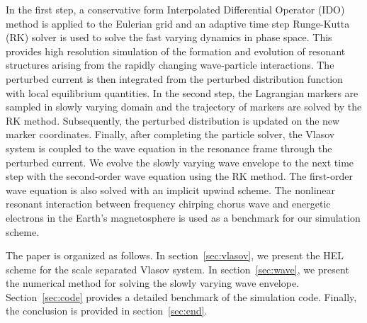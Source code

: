 In the first step,  a conservative form Interpolated Differential Operator (IDO)  method is applied to the Eulerian grid 
and  an adaptive time step Runge-Kutta (RK)  solver is used to solve the  fast varying dynamics in  phase space. 
This provides high resolution simulation of 
the formation and evolution of resonant structures arising from the rapidly changing wave-particle interactions.
The perturbed current is then integrated from the perturbed distribution function with local equilibrium quantities.
In the second step, the  Lagrangian markers are sampled in slowly varying domain 
and 
the trajectory of markers
are solved by the RK method.
Subsequently,  the perturbed distribution is updated on the new marker coordinates. 
Finally, after completing the particle solver, 
the Vlasov system is coupled to the wave equation in the resonance frame through the perturbed current.
We evolve the  slowly varying wave envelope 
to the next time step
with the second-order  wave equation
using the RK method.
The first-order wave equation is also solved with 
 an implicit upwind scheme.
The nonlinear resonant interaction between frequency chirping  chorus wave and energetic electrons in the Earth's magnetosphere is used as a benchmark for our simulation scheme.

The paper is  organized  as follows. 
 In section~\ref{sec:vlasov}, we present 
 the HEL scheme for the scale separated Vlasov system.
 In section~\ref{sec:wave}, we present  the numerical method for solving the slowly varying  wave envelope. Section~\ref{sec:code} provides a detailed benchmark of the simulation code. Finally, the conclusion is provided in section~\ref{sec:end}.

